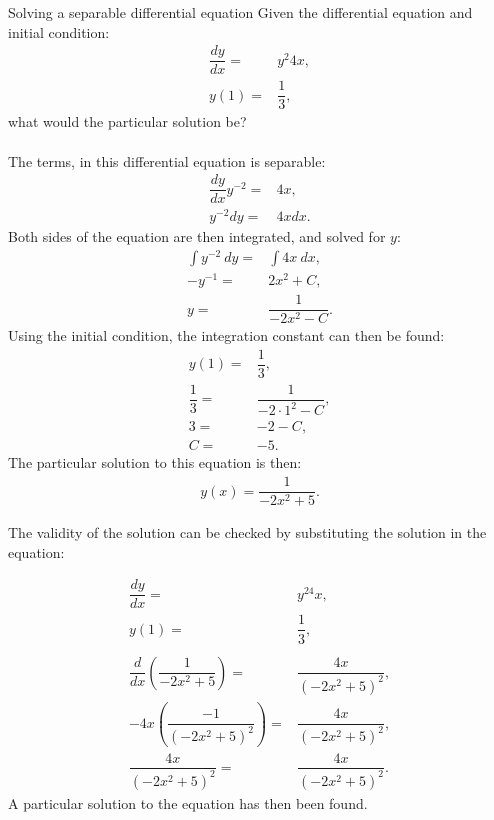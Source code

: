 \begin{example}{Solving a separable differential equation}{}
Given the differential equation and initial condition:
\begin{align*}
	\dfrac{dy}{dx} =& y^2 4x, \\
	y(1) =& \dfrac{1}{3},
\end{align*}
what would the particular solution be?
\\ \\
The terms, in this differential equation is separable: 
\begin{align*}
	\dfrac{dy}{dx} y^{-2} =& 4x, \\
	y^{-2} dy =& 4x dx. 
\end{align*}
Both sides of the equation are then integrated, and solved for $y$:
\begin{align*}
	\int{y^{-2}\ dy} =& \int{4x\  dx}, \\
	-y^{-1} =& 2x^2 +C, \\
	y =& \dfrac{1}{-2x^2-C}.
\end{align*}
Using the initial condition, the integration constant can then be found:
\begin{align*}
	y(1) =& \dfrac{1}{3}, \\
	\dfrac{1}{3} =& \dfrac{1}{-2 \cdot 1^2-C}, \\
	3 =& -2-C, \\
	C =& -5.
\end{align*}
The particular solution to this equation is then:
\begin{align*}
	y(x) = \dfrac{1}{-2x^2+5}.
\end{align*}

The validity of the solution can be checked by substituting the solution in the equation:


\begin{align*}
	\dfrac{dy}{dx} =& y^24x, \\
	y(1) =& \dfrac{1}{3},  \\
	\\
	\dfrac{d}{dx} \left(\dfrac{1}{-2x^2+5}\right) =& \dfrac{4x}{(-2x^2+5)^2}, \\
	-4x\left(\dfrac{-1}{(-2x^2+5)^2}\right)  =& \dfrac{4x}{(-2x^2+5)^2}, \\
	\dfrac{4x}{(-2x^2+5)^2} =& \dfrac{4x}{(-2x^2+5)^2}.
\end{align*}
A particular solution to the equation has then been found.
\end{example}
